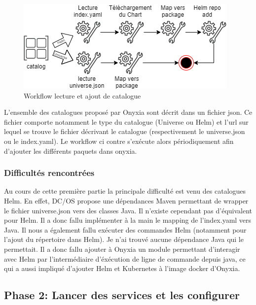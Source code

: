 \documentclass[11pt,fleqn]{book} %
\begin{document}
\begin{figure}
\includegraphics[scale=0.6]{Pictures/onyxia/workflow-catalog.png}
\caption{Workflow lecture et ajout de catalogue \newline}
\end{figure}
L'ensemble des catalogues proposé par Onyxia sont décrit dans un fichier json. Ce fichier comporte notamment le type du catalogue (Universe ou Helm) et l'url sur lequel se trouve le fichier décrivant le catalogue (respectivement le universe.json ou le index.yaml). Le workflow ci contre s'exécute alors périodiquement afin d'ajouter les différents paquets dans onyxia.

\subsubsection{Difficultés rencontrées}
Au cours de cette première partie la principale difficulté est venu des catalogues Helm. En effet, DC/OS propose une dépendances Maven permettant de wrapper le fichier universe.json vers des classes Java. Il n'existe cependant pas d'équivalent pour Helm. Il a donc fallu implémenter à la main le mapping de l'index.yaml vers Java. Il nous a également fallu exécuter des commandes Helm (notamment pour l'ajout du répertoire dans Helm). Je n'ai trouvé aucune dépendance Java qui le permettait. Il a donc fallu ajouter à Onyxia un module permettant d'interagir avec Helm par l'intermédiaire d'éxécution de ligne de commande depuis java, ce qui a aussi impliqué d'ajouter Helm et Kubernetes à l'image docker d'Onyxia.

\subsection{Phase 2: Lancer des services et les configurer}
\end{document}
